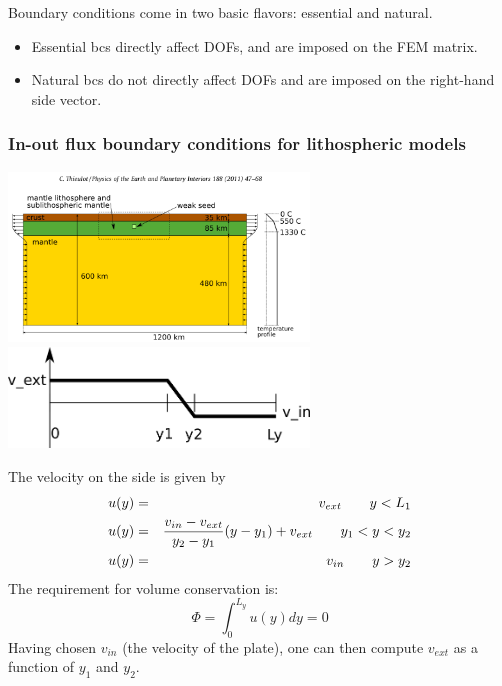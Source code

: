 
Boundary conditions come in two basic flavors: essential and natural.
\begin{itemize}
\item Essential bcs directly affect DOFs, and are imposed on the FEM matrix. 
\item Natural bcs do not directly affect DOFs and are imposed on the right-hand side vector.
\end{itemize}

\subsubsection{In-out flux boundary conditions for lithospheric models}

\begin{center}
\includegraphics[width=8cm]{images/boundary_conditions/bc1}\\
\includegraphics[width=8cm]{images/boundary_conditions/drawing.png}
\end{center}

The velocity on the side is given by
\begin{eqnarray}
u(y) &=& v_{ext} \quad\quad y<L_1 \nonumber\\
u(y) &=& \frac{v_{in}-v_{ext}}{y_2-y_1}(y-y_1) + v_{ext} \quad\quad y_1<y<y_2 \nonumber\\
u(y) &=& v_{in} \quad\quad y>y_2 \nonumber
\end{eqnarray}
The requirement for volume conservation is:
\[
\Phi=\int_{0}^{L_y} u(y) dy = 0
\]
Having chosen $v_{in}$ (the velocity of the plate), one can then compute $v_{ext}$
as a function of $y_1$ and $y_2$.

